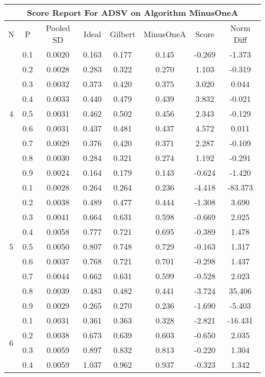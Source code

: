 \documentclass[11pt,a4paper]{report}
\begin{document}
\begin{longtable}{ | c | c || c | c | c | c | c | c | }
\hline
\multicolumn{8}{|c|}{ Score Report For ADSV on Algorithm MinusOneA} \\
\hline
N & P & Pooled SD &  Ideal &  Gilbert & MinusOneA  & Score & Norm Diff \\
 \hline
 \hline
 \endhead
\multirow{9}{*}{4} & 0.1 & 0.0020 & 0.163 & 0.177 & 0.145 & -0.269 & -1.373 \\
 & 0.2 & 0.0028 & 0.283 & 0.322 & 0.270 & 1.103 & -0.319 \\
 & 0.3 & 0.0032 & 0.373 & 0.420 & 0.375 & 3.020 & 0.044 \\
 & 0.4 & 0.0033 & 0.440 & 0.479 & 0.439 & 3.832 & -0.021 \\
 & 0.5 & 0.0031 & 0.462 & 0.502 & 0.456 & 2.343 & -0.129 \\
 & 0.6 & 0.0031 & 0.437 & 0.481 & 0.437 & 4.572 & 0.011 \\
 & 0.7 & 0.0029 & 0.376 & 0.420 & 0.371 & 2.287 & -0.109 \\
 & 0.8 & 0.0030 & 0.284 & 0.321 & 0.274 & 1.192 & -0.291 \\
 & 0.9 & 0.0024 & 0.164 & 0.179 & 0.143 & -0.624 & -1.420 \\
 \hline
\multirow{9}{*}{5} & 0.1 & 0.0028 & 0.264 & 0.264 & 0.236 & -4.418 & -83.373 \\
 & 0.2 & 0.0038 & 0.489 & 0.477 & 0.444 & -1.308 & 3.690 \\
 & 0.3 & 0.0041 & 0.664 & 0.631 & 0.598 & -0.669 & 2.025 \\
 & 0.4 & 0.0058 & 0.777 & 0.721 & 0.695 & -0.389 & 1.478 \\
 & 0.5 & 0.0050 & 0.807 & 0.748 & 0.729 & -0.163 & 1.317 \\
 & 0.6 & 0.0037 & 0.768 & 0.721 & 0.701 & -0.298 & 1.437 \\
 & 0.7 & 0.0044 & 0.662 & 0.631 & 0.599 & -0.528 & 2.023 \\
 & 0.8 & 0.0039 & 0.483 & 0.482 & 0.441 & -3.724 & 35.406 \\
 & 0.9 & 0.0029 & 0.265 & 0.270 & 0.236 & -1.690 & -5.403 \\
 \hline
\multirow{9}{*}{6} & 0.1 & 0.0031 & 0.361 & 0.363 & 0.328 & -2.821 & -16.431 \\
 & 0.2 & 0.0038 & 0.673 & 0.639 & 0.603 & -0.650 & 2.035 \\
 & 0.3 & 0.0059 & 0.897 & 0.832 & 0.813 & -0.220 & 1.304 \\
 & 0.4 & 0.0059 & 1.037 & 0.962 & 0.937 & -0.323 & 1.342 \\

\end{longtable}
\end{document}
